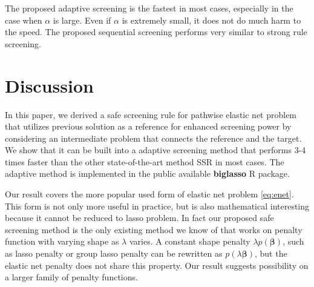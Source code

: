 The proposed adaptive screening is the fastest in most cases, especially in the case when $\alpha$ is large. Even if $\alpha$ is extremely small, it does not do much harm to the speed. The proposed sequential screening performs very similar to strong rule screening.

\section{Discussion}

In this paper, we derived a safe screening rule for pathwise elastic net problem that utilizes previous solution as a reference for enhanced screening power by considering an intermediate problem that connects the reference and the target. We show that it can be built into a adaptive screening method that performs 3-4 times faster than the other state-of-the-art method SSR in most cases. The adaptive method is implemented in the public available \textbf{biglasso} R package.

Our result covers the more popular used form of elastic net problem \eqref{eq:enet}. This form is not only more useful in practice, but is also mathematical interesting because it cannot be reduced to lasso problem. In fact our proposed safe screening method is the only existing method we know of that works on penalty function with varying shape as $\lambda$ varies. A constant shape penalty $\lambda p(\boldsymbol\beta)$, such as lasso penalty or group lasso penalty can be rewritten as $p(\lambda\boldsymbol\beta)$, but the elastic net penalty does not share this property. Our result suggests possibility on a larger family of penalty functions.


